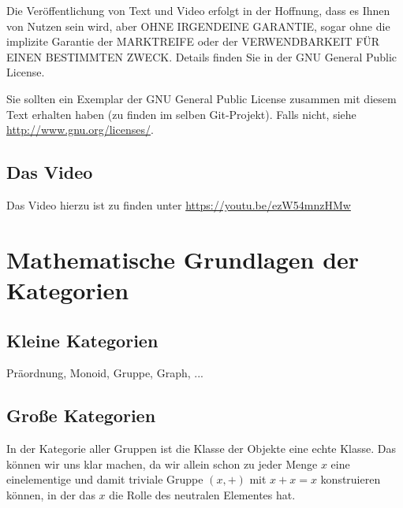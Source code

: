 \documentclass[a4paper]{amsart}
\theoremstyle{definition}
\begin{document}
Die Veröffentlichung von Text und Video erfolgt in der Hoffnung, dass es Ihnen von Nutzen sein wird,
aber OHNE IRGENDEINE GARANTIE, sogar ohne die implizite Garantie der MARKTREIFE oder der
VERWENDBARKEIT FÜR EINEN BESTIMMTEN ZWECK. Details finden Sie in der GNU General Public License.

Sie sollten ein Exemplar der GNU General Public License zusammen mit diesem Text erhalten haben
(zu finden im selben Git-Projekt).
Falls nicht, siehe \url{http://www.gnu.org/licenses/}.

\subsection*{Das Video}
Das Video hierzu ist zu finden unter
{\tiny
   \url{https://youtu.be/ezW54mnzHMw}
}

\section{Mathematische Grundlagen der Kategorien}

\subsection{Kleine Kategorien}
Präordnung, Monoid, Gruppe, Graph, ...

\subsection{Große Kategorien}



In der Kategorie aller Gruppen ist die Klasse der Objekte eine echte Klasse. Das können wir uns klar machen, da wir allein schon zu jeder Menge $x$ eine einelementige und damit triviale Gruppe $( {x}, +)$ mit $x + x = x$ konstruieren können, in der das $x$ die Rolle des neutralen Elementes hat.
\end{document}
